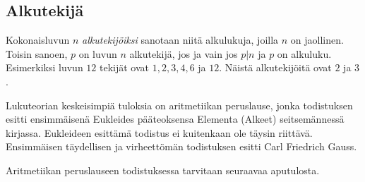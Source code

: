 \subsection*{Alkutekijä} Kokonaisluvun $n$ {\em alkutekijöiksi} sanotaan niitä alkulukuja, joilla $n$ on jaollinen. Toisin sanoen, $p$ on luvun $n$ alkutekijä, jos ja vain jos $p|n$ ja $p$ on alkuluku.  Esimerkiksi luvun $12$ tekijät ovat $1, 2, 3, 4, 6$ ja $12$. Näistä alkutekijöitä ovat $2$ ja $3$.


Lukuteorian keskeisimpiä tuloksia on aritmetiikan peruslause, jonka todistuksen esitti ensimmäisenä Eukleides pääteoksensa Elementa (Alkeet) seitsemännessä kirjassa. Eukleideen esittämä todistus ei kuitenkaan ole täysin riittävä. Ensimmäisen täydellisen ja virheettömän todistuksen esitti Carl Friedrich Gauss.


Aritmetiikan peruslauseen todistuksessa tarvitaan seuraavaa aputulosta.


